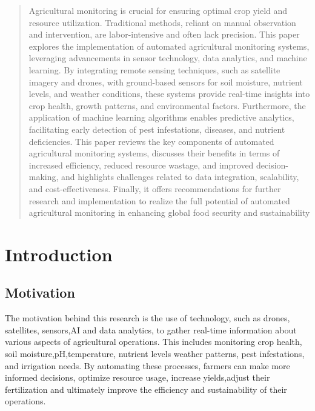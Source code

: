 \documentclass{article}
\begin{document}



\tableofcontents
\newpage

\begin{abstract}
Agricultural monitoring is crucial for ensuring optimal
crop yield and resource utilization. Traditional methods,
reliant on manual observation and intervention, are
labor-intensive and often lack precision. This paper
explores the implementation of automated agricultural
monitoring systems, leveraging advancements in sensor
technology, data analytics, and machine learning. By
integrating remote sensing techniques, such as satellite
imagery and drones, with ground-based sensors for soil
moisture, nutrient levels, and weather conditions, these
systems provide real-time insights into crop health,
growth patterns, and environmental factors. Furthermore,
the application of machine learning algorithms enables
predictive analytics, facilitating early detection of pest
infestations, diseases, and nutrient deficiencies. This
paper reviews the key components of automated
agricultural monitoring systems, discusses their benefits
in terms of increased efficiency, reduced resource wastage,
and improved decision-making, and highlights challenges
related to data integration, scalability, and
cost-effectiveness. Finally, it offers recommendations for
further research and implementation to realize the full
potential of automated agricultural monitoring in
enhancing global food security and sustainability
\end{abstract}
\newpage
\section{Introduction}
\subsection{Motivation}
The motivation behind this research is the use of technology, such as drones, satellites, sensors,AI and data analytics, to gather real-time information about various aspects of agricultural operations. This includes monitoring crop health, soil moisture,pH,temperature, nutrient levels  weather patterns, pest infestations, and irrigation needs. By automating these processes, farmers can make more informed decisions, optimize resource usage, increase yields,adjust their fertilization  and ultimately improve the efficiency and sustainability of their operations.
\end{document}
